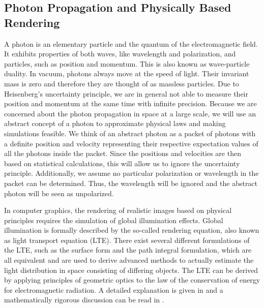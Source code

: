 \documentclass{stdlocal}
\begin{document}


  \subsection{Photon Propagation and Physically Based Rendering} %
  \label{sub:photon_propagation_and_physically_based_rendering}
    A photon is an elementary particle and the quantum of the electromagnetic field.
    It exhibits properties of both waves, like wavelength and polarization, and particles, such as position and momentum.
    This is also known as wave-particle duality.
    In vacuum, photons always move at the speed of light.
    Their invariant mass is zero and therefore they are thought of as massless particles.
    Due to Heisenberg's uncertainty principle, we are in general not able to measure their position and momentum at the same time with infinite precision.
    Because we are concerned about the photon propagation in space at a large scale, we will use an abstract concept of a photon to approximate physical laws and making simulations feasible.
    We think of an abstract photon as a packet of photons with a definite position and velocity representing their respective expectation values of all the photons inside the packet.
    Since the positions and velocities are then based on statistical calculations, this will allow us to ignore the uncertainty principle.
    Additionally, we assume no particular polarization or wavelength in the packet can be determined.
    Thus, the wavelength will be ignored and the abstract photon will be seen as unpolarized.
    \autocite{landau2014}

    In computer graphics, the rendering of realistic images based on physical principles requires the simulation of global illumination effects.
    Global illumination is formally described by the so-called rendering equation, also known as light transport equation (LTE).
    There exist several different formulations of the LTE, such as the surface form and the path integral formulation, which are all equivalent and are used to derive advanced methods to actually estimate the light distribution in space consisting of differing objects.
    The LTE can be derived by applying principles of geometric optics to the law of the conservation of energy for electromagnetic radiation.
    A detailed explanation is given in \textcite{pharr2016} and a mathematically rigorous discussion can be read in \textcite{pawellek2017}.
\end{document}

